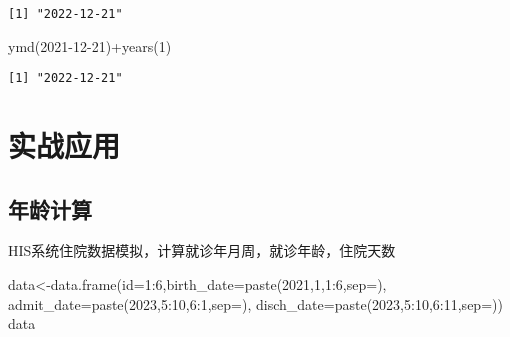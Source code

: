 \documentclass[
  letterpaper,
  DIV=11,
  numbers=noendperiod]{scrreprt}
\newenvironment{Shaded}{\begin{snugshade}}{\end{snugshade}}
\newcommand{\AttributeTok}[1]{\textcolor[rgb]{0.40,0.45,0.13}{#1}}
\newcommand{\DecValTok}[1]{\textcolor[rgb]{0.68,0.00,0.00}{#1}}
\newcommand{\FunctionTok}[1]{\textcolor[rgb]{0.28,0.35,0.67}{#1}}
\newcommand{\NormalTok}[1]{\textcolor[rgb]{0.00,0.23,0.31}{#1}}
\newcommand{\OtherTok}[1]{\textcolor[rgb]{0.00,0.23,0.31}{#1}}
\newcommand{\SpecialCharTok}[1]{\textcolor[rgb]{0.37,0.37,0.37}{#1}}
\newcommand{\StringTok}[1]{\textcolor[rgb]{0.13,0.47,0.30}{#1}}
\begin{document}
\begin{verbatim}
[1] "2022-12-21"
\end{verbatim}

\begin{Shaded}
\begin{Highlighting}[]
\FunctionTok{ymd}\NormalTok{(}\StringTok{\textquotesingle{}2021{-}12{-}21\textquotesingle{}}\NormalTok{)}\SpecialCharTok{+}\FunctionTok{years}\NormalTok{(}\DecValTok{1}\NormalTok{)}
\end{Highlighting}
\end{Shaded}

\begin{verbatim}
[1] "2022-12-21"
\end{verbatim}

\section{实战应用}\label{ux5b9eux6218ux5e94ux7528}

\subsection{年龄计算}\label{ux5e74ux9f84ux8ba1ux7b97}

HIS系统住院数据模拟，计算就诊年月周，就诊年龄，住院天数

\begin{Shaded}
\begin{Highlighting}[]
\NormalTok{data}\OtherTok{\textless{}{-}}\FunctionTok{data.frame}\NormalTok{(}\AttributeTok{id=}\DecValTok{1}\SpecialCharTok{:}\DecValTok{6}\NormalTok{,}\AttributeTok{birth\_date=}\FunctionTok{paste}\NormalTok{(}\DecValTok{2021}\NormalTok{,}\DecValTok{1}\NormalTok{,}\DecValTok{1}\SpecialCharTok{:}\DecValTok{6}\NormalTok{,}\AttributeTok{sep=}\StringTok{\textquotesingle{}{-}\textquotesingle{}}\NormalTok{),}
                 \AttributeTok{admit\_date=}\FunctionTok{paste}\NormalTok{(}\DecValTok{2023}\NormalTok{,}\DecValTok{5}\SpecialCharTok{:}\DecValTok{10}\NormalTok{,}\DecValTok{6}\SpecialCharTok{:}\DecValTok{1}\NormalTok{,}\AttributeTok{sep=}\StringTok{\textquotesingle{}{-}\textquotesingle{}}\NormalTok{),}
                 \AttributeTok{disch\_date=}\FunctionTok{paste}\NormalTok{(}\DecValTok{2023}\NormalTok{,}\DecValTok{5}\SpecialCharTok{:}\DecValTok{10}\NormalTok{,}\DecValTok{6}\SpecialCharTok{:}\DecValTok{11}\NormalTok{,}\AttributeTok{sep=}\StringTok{\textquotesingle{}{-}\textquotesingle{}}\NormalTok{))}
\NormalTok{data}
\end{Highlighting}
\end{Shaded}
\end{document}
